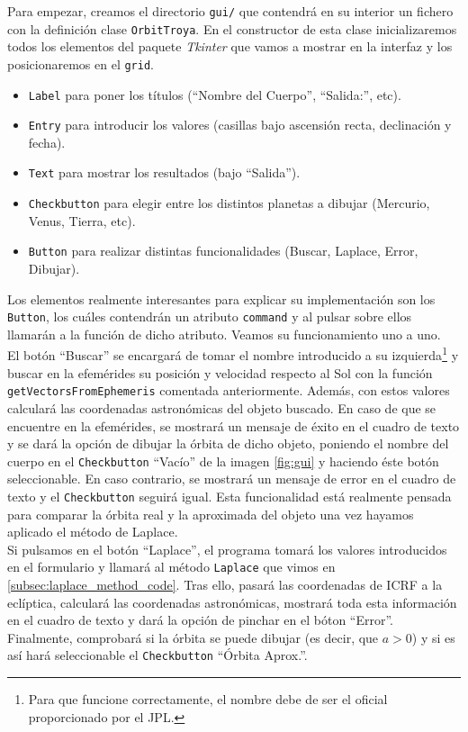 \documentclass[11pt]{book}
\begin{document}
Para empezar, creamos el directorio \texttt{gui/} que contendrá en su interior un fichero con la definición clase \texttt{OrbitTroya}. En el constructor de esta clase inicializaremos todos los elementos del paquete \textit{Tkinter} que vamos a mostrar en la interfaz y los posicionaremos en el \texttt{grid}.
\begin{itemize}
\item \texttt{Label} para poner los títulos (``Nombre del Cuerpo'', ``Salida:'', etc).
\item \texttt{Entry} para introducir los valores (casillas bajo ascensión recta, declinación y fecha).
\item \texttt{Text} para mostrar los resultados (bajo ``Salida'').
\item \texttt{Checkbutton} para elegir entre los distintos planetas a dibujar (Mercurio, Venus, Tierra, etc).
\item \texttt{Button} para realizar distintas funcionalidades (Buscar, Laplace, Error, Dibujar).
\end{itemize}

Los elementos realmente interesantes para explicar su implementación son los \texttt{Button}, los cuáles contendrán un atributo \texttt{command} y al pulsar sobre ellos llamarán a la función de dicho atributo. Veamos su funcionamiento uno a uno.\\

El botón ``Buscar'' se encargará de tomar el nombre introducido a su izquierda\footnote{Para que funcione correctamente, el nombre debe de ser el oficial proporcionado por el JPL.} y buscar en la efemérides su posición y velocidad respecto al Sol con la función \texttt{getVectorsFromEphemeris} comentada anteriormente. Además, con estos valores calculará las coordenadas astronómicas del objeto buscado. En caso de que se encuentre en la efemérides, se mostrará un mensaje de éxito en el cuadro de texto y se dará la opción de dibujar la órbita de dicho objeto, poniendo el nombre del cuerpo en el \texttt{Checkbutton} ``Vacío'' de la imagen \ref{fig:gui} y haciendo éste botón seleccionable. En caso contrario, se mostrará un mensaje de error en el cuadro de texto y el \texttt{Checkbutton} seguirá igual. Esta funcionalidad está realmente pensada para comparar la órbita real y la aproximada del objeto una vez hayamos aplicado el método de Laplace.\\

Si pulsamos en el botón ``Laplace'', el programa tomará los valores introducidos en el formulario y llamará al método \texttt{Laplace} que vimos en \ref{subsec:laplace_method_code}. Tras ello, pasará las coordenadas de ICRF a la eclíptica, calculará las coordenadas astronómicas, mostrará toda esta información en el cuadro de texto y dará la opción de pinchar en el bóton ``Error''. Finalmente, comprobará si la órbita se puede dibujar (es decir, que $a>0$) y si es así hará seleccionable el \texttt{Checkbutton} ``Órbita Aprox.''.\\
\end{document}
